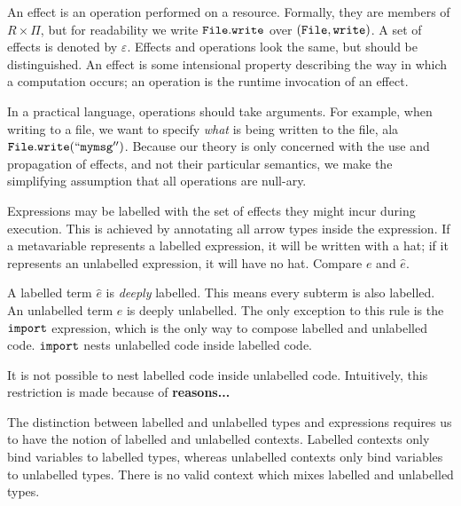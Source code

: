 An effect is an operation performed on a resource. Formally, they are members of $R \times \Pi$, but for readability we write $\mathtt{File.write}$ over $\mathtt{(File, write)}$. A set of effects is denoted by $\varepsilon$. Effects and operations look the same, but should be distinguished. An effect is some intensional property describing the way in which a computation occurs; an operation is the runtime invocation of an effect.

In a practical language, operations should take arguments. For example, when writing to a file, we want to specify \textit{what} is being written to the file, ala $\mathtt{File.write(``my msg'')}$. Because our theory is only concerned with the use and propagation of effects, and not their particular semantics, we make the simplifying assumption that all operations are null-ary.

Expressions may be labelled with the set of effects they might incur during execution. This is achieved by annotating all arrow types inside the expression. If a metavariable represents a labelled expression, it will be written with a hat; if it represents an unlabelled expression, it will have no hat. Compare $e$ and $\hat e$.

A labelled term $\hat e$ is \textit{deeply} labelled. This means every subterm is also labelled. An unlabelled term $e$ is deeply unlabelled. The only exception to this rule is the $\mathtt{import}$ expression, which is the only way to compose labelled and unlabelled code. $\mathtt{import}$ nests unlabelled code inside labelled code.

It is not possible to nest labelled code inside unlabelled code. Intuitively, this restriction is made because of \textbf{reasons...}

The distinction between labelled and unlabelled types and expressions requires us to have the notion of labelled and unlabelled contexts. Labelled contexts only bind variables to labelled types, whereas unlabelled contexts only bind variables to unlabelled types. There is no valid context which mixes labelled and unlabelled types. \\

